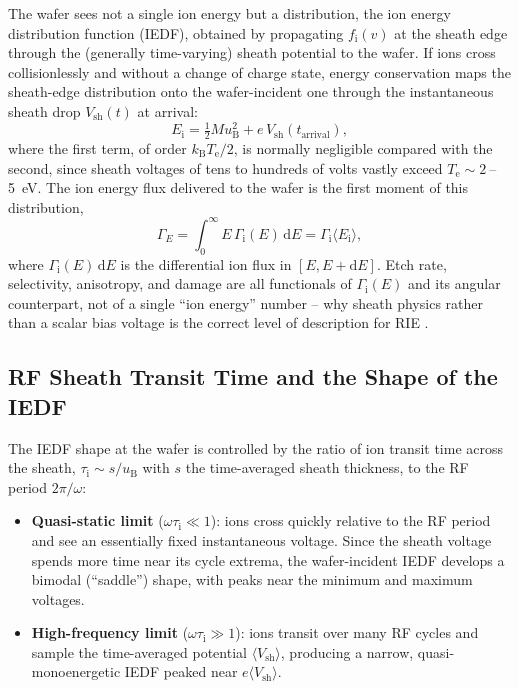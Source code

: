 The wafer sees not a single ion energy but a distribution, the ion energy distribution function (IEDF), obtained by propagating $f_{\mathrm{i}}(v)$ at the sheath edge through the (generally time-varying) sheath potential to the wafer. If ions cross collisionlessly and without a change of charge state, energy conservation maps the sheath-edge distribution onto the wafer-incident one through the instantaneous sheath drop $V_{\mathrm{sh}}(t)$ at arrival:
\begin{equation}
E_{\mathrm{i}} = \tfrac{1}{2} M u_{\mathrm{B}}^{2} + e\, V_{\mathrm{sh}}(t_{\mathrm{arrival}}),
\label{eq:etch_energy_map}
\end{equation}
where the first term, of order $k_{\mathrm{B}} T_{\mathrm{e}}/2$, is normally negligible compared with the second, since sheath voltages of tens to hundreds of volts vastly exceed $T_{\mathrm{e}} \sim \SI{2}{}$--\SI{5}{\electronvolt}. The ion energy flux delivered to the wafer is the first moment of this distribution,
\begin{equation}
\Gamma_{E} = \int_{0}^{\infty} E\, \Gamma_{\mathrm{i}}(E)\, \mathrm{d}E = \Gamma_{\mathrm{i}} \langle E_{\mathrm{i}} \rangle,
\label{eq:etch_gammaE}
\end{equation}
where $\Gamma_{\mathrm{i}}(E)\,\mathrm{d}E$ is the differential ion flux in $[E, E+\mathrm{d}E]$. Etch rate, selectivity, anisotropy, and damage are all functionals of $\Gamma_{\mathrm{i}}(E)$ and its angular counterpart, not of a single ``ion energy'' number -- why sheath physics rather than a scalar bias voltage is the correct level of description for RIE \cite{ref0539}.

\subsection{RF Sheath Transit Time and the Shape of the IEDF}

The IEDF shape at the wafer is controlled by the ratio of ion transit time across the sheath, $\tau_{\mathrm{i}} \sim s/u_{\mathrm{B}}$ with $s$ the time-averaged sheath thickness, to the RF period $2\pi/\omega$:

\begin{itemize}
\item \textbf{Quasi-static limit} ($\omega \tau_{\mathrm{i}} \ll 1$): ions cross quickly relative to the RF period and see an essentially fixed instantaneous voltage. Since the sheath voltage spends more time near its cycle extrema, the wafer-incident IEDF develops a bimodal (``saddle'') shape, with peaks near the minimum and maximum voltages.
\item \textbf{High-frequency limit} ($\omega \tau_{\mathrm{i}} \gg 1$): ions transit over many RF cycles and sample the time-averaged potential $\langle V_{\mathrm{sh}} \rangle$, producing a narrow, quasi-monoenergetic IEDF peaked near $e\langle V_{\mathrm{sh}} \rangle$.
\end{itemize}

